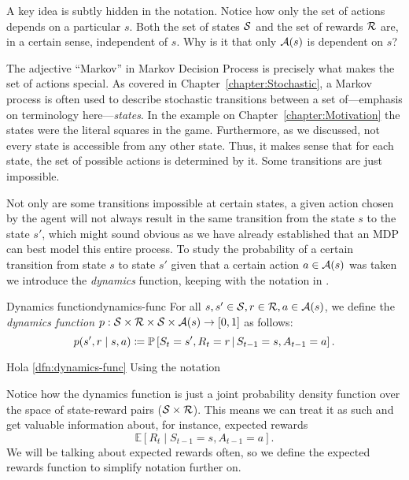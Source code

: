 A key idea is subtly hidden in the notation. Notice how only the set of actions
depends on a particular $s$. Both the set of states $\mathcal{S}$ and the set of
rewards $\mathcal{R}$ are, in a certain sense, independent of $s$. Why is it that
only $\mathcal{A}(s)$ is dependent on $s$?

The adjective ``Markov'' in Markov Decision Process is precisely what makes the
set of actions special. As covered in Chapter~\ref{chapter:Stochastic}, a Markov
process is often used to describe stochastic transitions between a set
of---emphasis on terminology here---\textit{states}. In the example on
Chapter~\ref{chapter:Motivation} the states were the literal squares in the
game. Furthermore, as we discussed, not every state is accessible from any other
state.  Thus, it makes sense that for each state, the set of possible actions is
determined by it. Some transitions are just impossible.

Not only are some transitions impossible at certain states, a given action
chosen by the agent will not always result in the same transition from the state
$s$ to the state $s'$, which might sound obvious as we have already established
that an MDP can best model this entire process. To study the probability
of a certain transition from state $s$ to state $s'$ given that a certain action
$a \in \mathcal{A}(s)$ was taken we introduce the \textit{dynamics} function,
keeping with the notation in \cite{SuttonBarto}.

\begin{dfn}{Dynamics function}{dynamics-func}
	For all $s, s' \in \mathcal{S}, r \in \mathcal{R}, a \in 
	\mathcal{A}(s)$, we define the \emph{dynamics function} $p: 
	\mathcal{S} \times \mathcal{R} \times \mathcal{S} \times \mathcal{A}(s) 
	\to [0, 1]$ as follows:
	\begin{equation*}
		p(s', r \mid s, a) \coloneqq \mathbb{P}\left[S_t = s', R_t = r 
		\,\middle\vert\, S_{t-1} = s, A_{t-1} = a\right].
	\end{equation*}
\end{dfn}

Hola \ref{dfn:dynamics-func}
Using the notation 

Notice how the dynamics function is just a joint probability density function
over the space of state-reward pairs ($\mathcal{S} \times \mathcal{R}$). This means we
can treat it as such and get valuable information about, for instance, expected
rewards
\begin{equation*}
	\mathbb{E} \left[ R_t \mid S_{t-1} = s, A_{t-1} = a \right].
\end{equation*}
We will be talking about expected rewards often, so we define the expected
rewards function to simplify notation further on.

